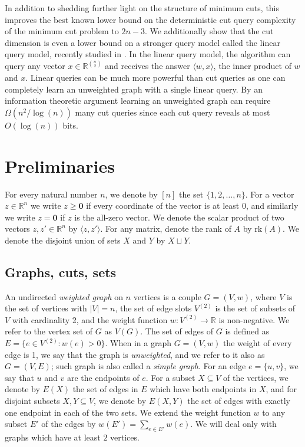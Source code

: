 \documentclass[10pt,a4paper]{article}
\newcommand{\R}{\mathbb{R}}
\newcommand{\braket}[2]{\langle#1, #2\rangle}
\newcommand{\rk}{\mathrm{rk}}
\newcommand{\1}{\mathbf{1}}
\theoremstyle{definition}
\begin{document}
In addition to shedding further light on the structure of minimum cuts, this improves the best known lower bound on the deterministic cut query complexity of
the minimum cut problem to $2n-3$.  We additionally show that the cut dimension is even a lower bound on a stronger query model called the linear query model, recently
studied in \cite{ACK20}.  In the linear query model, the algorithm can query any vector $x \in \R^{\binom{n}{2}}$ and receives the answer $\braket{w}{x}$, the
inner product of $w$ and $x$.  Linear queries can be much more powerful than cut queries as one can completely learn an unweighted graph with a single linear query.
By an information theoretic argument learning an unweighted graph can require $\Omega(n^2/\log(n))$ many cut queries since each cut query reveals at most
$O(\log (n))$ bits.


\setcounter{theorem}{3}\section{Preliminaries}\label{sec:prelim}

For every natural number $n$, we denote by $[n]$ the set
$\{1,2, \ldots, n\}$.
For a vector $z \in \R^n$ we write $z \geq \mathbf{0}$ if every coordinate of the vector
is at least 0, and similarly we write $z = \mathbf{0}$ if $z$ is the all-zero vector.
We denote the scalar product of two vectors $z,z' \in \R^n$
by $\braket{{z}}{z'}$. For any matrix, denote the rank of $A$ by $\rk(A)$.
We denote the disjoint union of sets $X$ and $Y$ by $X \sqcup Y.$

\subsection{Graphs, cuts, sets}

An undirected {\em weighted graph} on $n$ vertices is a couple
$G = (V,w)$, where $V$ is the set of vertices with $|V| = n$,
the set of edge slots
$V^{(2)}$ is the
set of subsets of $V$ with cardinality 2, and the weight function
$w : V^{(2)} \rightarrow \R $ is non-negative. We refer to the vertex set of $G$ as $V(G)$.
The set of edges of $G$
is defined as $E = \{e \in V^{(2)} : w(e) > 0\}$.
When in a graph $G=(V,w)$ the weight of every edge is 1, we say that the graph is {\em unweighted},
and we refer to it also as $G=(V,E)$; such graph is also called a {\em simple graph}.
For an edge $e = \{u,v\} $, we say that $u$ and $v$ are the endpoints of $e$.
For a subset $X \subseteq V$ of the vertices, we denote by $E(X)$ the set of edges in $E$
which have both endpoints in $X$, and for disjoint subsets $X, Y \subseteq V$, we denote by
$E(X, Y)$ the set of edges with exactly one endpoint in each of the two sets.
We extend the weight function $w$ to any subset $E'$ of the edges by $w(E') = \sum_{e \in E'} w(e)$.
We will deal only with graphs which have at least $2$ vertices.
\end{document}
